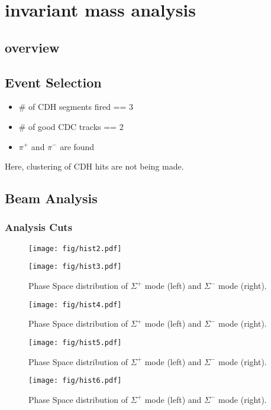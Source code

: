 \section{ \reaction invariant mass analysis}
\subsection{overview}


\subsection{Event Selection}
\begin{itemize}
\item \# of CDH segments fired == 3
\item \# of good CDC tracks == 2
\item $\pi^+$ and $\pi^-$ are found
\end{itemize}
Here, clustering of CDH hits are not being made.


\subsection{Beam Analysis}
\subsubsection{Analysis Cuts}

\begin{figure}
\texttt{[image: fig/hist2.pdf]}
\end{figure}
\begin{figure}
\texttt{[image: fig/hist3.pdf]}
\caption{Phase Space distribution of $\Sigma^+$ mode (left) and $\Sigma^-$ mode (right).}
\end{figure}


\begin{figure}
\texttt{[image: fig/hist4.pdf]}
\caption{Phase Space distribution of $\Sigma^+$ mode (left) and $\Sigma^-$ mode (right).}
\end{figure}

\begin{figure}
\texttt{[image: fig/hist5.pdf]}
\caption{Phase Space distribution of $\Sigma^+$ mode (left) and $\Sigma^-$ mode (right).}
\end{figure}


\begin{figure}
\texttt{[image: fig/hist6.pdf]}
\caption{Phase Space distribution of $\Sigma^+$ mode (left) and $\Sigma^-$ mode (right).}
\end{figure}

